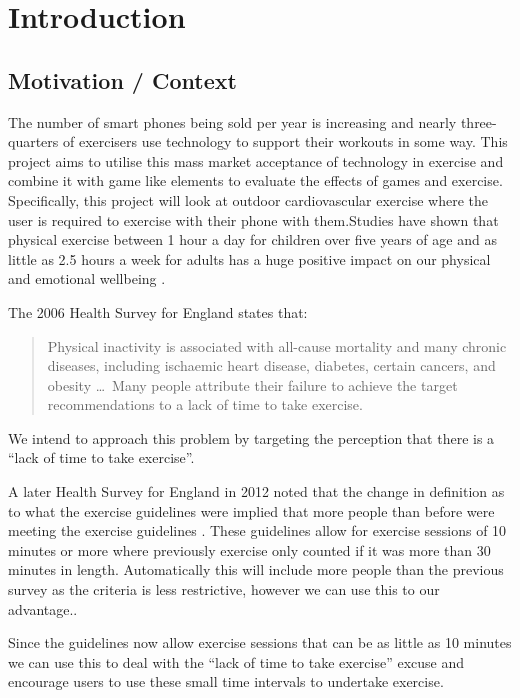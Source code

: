 \chapter{Introduction}\label{ch_intro}

\section{Motivation / Context}
The number of smart phones being sold per year is
increasing\cite{phones_gartner, phones_guardian} and nearly
three-quarters of exercisers use technology to support their
workouts in some way\cite{lifefitness}. This project aims to utilise
this mass market 
acceptance of technology in exercise and combine it with game like
elements to evaluate the effects of games and
exercise. Specifically, this project will look at outdoor
cardiovascular exercise where the user is required to exercise with
their phone with them.Studies have shown that physical exercise
between 1 hour a day for children over five years of age and as
little as 2.5 hours a week for adults has a huge positive impact on
our physical and emotional wellbeing\cite{govsurvey, amsurvey} .

The 2006 Health Survey for England\cite{exercise} states that: 
\begin{quote}
  Physical inactivity is associated with all-cause mortality and
  many chronic diseases, including ischaemic heart disease, diabetes,
  certain cancers, and obesity \dots \ Many people attribute their
  failure to achieve the target recommendations to a lack of time to
  take exercise. 
\end{quote} 
We intend to approach this problem by targeting the perception that
there is a ``lack of time to take exercise''. 

A later Health Survey for England in 2012 noted that the change in
definition as to what the exercise guidelines were implied that more
people than before were meeting the exercise guidelines
\cite{exercise_2012}. These guidelines allow for exercise sessions of
10 minutes or more where previously exercise only counted if it was
more than 30 minutes in length. Automatically this will include
more people than the previous survey as the criteria is less
restrictive, however we can use this to our advantage..

Since the guidelines now allow exercise sessions that can be as little
as 10 minutes we can use this to deal with the ``lack of time to take
exercise'' excuse and encourage users to use these small time
intervals to undertake exercise. 

